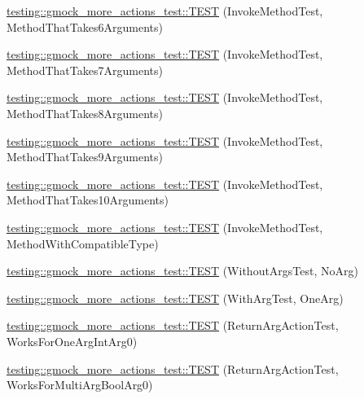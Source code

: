 \begin{DoxyCompactItemize}
\item 
\mbox{\hyperlink{namespacetesting_1_1gmock__more__actions__test_a715c088109e141aa577e497e3729b98b}{testing\+::gmock\+\_\+more\+\_\+actions\+\_\+test\+::\+T\+E\+ST}} (Invoke\+Method\+Test, Method\+That\+Takes6\+Arguments)
\item 
\mbox{\hyperlink{namespacetesting_1_1gmock__more__actions__test_a1f11171c55d049143c980502213e0b11}{testing\+::gmock\+\_\+more\+\_\+actions\+\_\+test\+::\+T\+E\+ST}} (Invoke\+Method\+Test, Method\+That\+Takes7\+Arguments)
\item 
\mbox{\hyperlink{namespacetesting_1_1gmock__more__actions__test_a5bfedd2255bbfe7ffcbc76ec581b2ff6}{testing\+::gmock\+\_\+more\+\_\+actions\+\_\+test\+::\+T\+E\+ST}} (Invoke\+Method\+Test, Method\+That\+Takes8\+Arguments)
\item 
\mbox{\hyperlink{namespacetesting_1_1gmock__more__actions__test_acdcc7f6a35e6373f3d0b3a71f98c418b}{testing\+::gmock\+\_\+more\+\_\+actions\+\_\+test\+::\+T\+E\+ST}} (Invoke\+Method\+Test, Method\+That\+Takes9\+Arguments)
\item 
\mbox{\hyperlink{namespacetesting_1_1gmock__more__actions__test_a14b55eb4c0d0b3149e269eea1443cb58}{testing\+::gmock\+\_\+more\+\_\+actions\+\_\+test\+::\+T\+E\+ST}} (Invoke\+Method\+Test, Method\+That\+Takes10\+Arguments)
\item 
\mbox{\hyperlink{namespacetesting_1_1gmock__more__actions__test_adb0c29d688c079ad5bf07d5a0bd72aea}{testing\+::gmock\+\_\+more\+\_\+actions\+\_\+test\+::\+T\+E\+ST}} (Invoke\+Method\+Test, Method\+With\+Compatible\+Type)
\item 
\mbox{\hyperlink{namespacetesting_1_1gmock__more__actions__test_a68748f21021e787dfdc095691c94d495}{testing\+::gmock\+\_\+more\+\_\+actions\+\_\+test\+::\+T\+E\+ST}} (Without\+Args\+Test, No\+Arg)
\item 
\mbox{\hyperlink{namespacetesting_1_1gmock__more__actions__test_a40664c1acdc3650e8edf9a9a49b008de}{testing\+::gmock\+\_\+more\+\_\+actions\+\_\+test\+::\+T\+E\+ST}} (With\+Arg\+Test, One\+Arg)
\item 
\mbox{\hyperlink{namespacetesting_1_1gmock__more__actions__test_a717ea38d7b78b6d51b4d617ed317d26e}{testing\+::gmock\+\_\+more\+\_\+actions\+\_\+test\+::\+T\+E\+ST}} (Return\+Arg\+Action\+Test, Works\+For\+One\+Arg\+Int\+Arg0)
\item 
\mbox{\hyperlink{namespacetesting_1_1gmock__more__actions__test_a0705d7e6083d129caae9d91cc5d6d570}{testing\+::gmock\+\_\+more\+\_\+actions\+\_\+test\+::\+T\+E\+ST}} (Return\+Arg\+Action\+Test, Works\+For\+Multi\+Arg\+Bool\+Arg0)

\end{DoxyCompactItemize}
